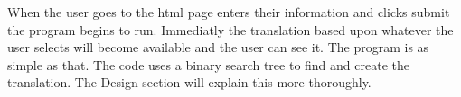 When the user goes to the html page enters their information and clicks submit the program begins to run. Immediatly the translation based upon whatever the user selects will become available and the user can see it. The program is as simple as that. The code uses a binary search tree to find and create the translation. The Design section will explain this more thoroughly. 